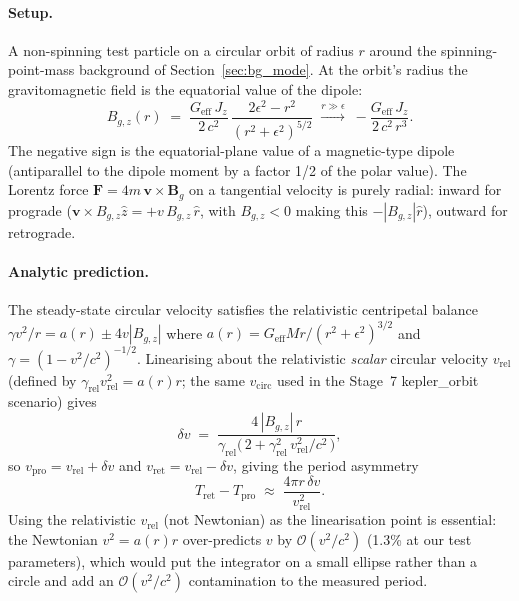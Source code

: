 \documentclass[11pt,a4paper]{article}
\newcommand{\vv}[1]{\mathbf{#1}}
\newcommand{\order}[1]{\mathcal{O}(#1)}
\begin{document}
\paragraph{Setup.}  A non-spinning test particle on a circular orbit of
radius $r$ around the spinning-point-mass background of
Section~\ref{sec:bg_mode}.  At the orbit's radius the gravitomagnetic
field is the equatorial value of the dipole:
\begin{equation}
\label{eq:Bgz_dipole_equatorial}
  B_{g,z}(r) \;=\; \frac{G_{\mathrm{eff}}\,J_z}{2\,c^2}\,
                  \frac{2\epsilon^2 - r^2}{(r^2 + \epsilon^2)^{5/2}}
              \;\xrightarrow{r \gg \epsilon}\;
              -\frac{G_{\mathrm{eff}}\,J_z}{2\,c^2\,r^3}.
\end{equation}
The negative sign is the equatorial-plane value of a magnetic-type
dipole (antiparallel to the dipole moment by a factor 1/2 of the polar
value).  The Lorentz force $\vv{F} = 4m\,\vv{v}\!\times\!\vv{B}_g$ on
a tangential velocity is purely radial: inward for prograde
($\vv{v}\!\times\!B_{g,z}\hat z = +v\,B_{g,z}\,\hat r$, with $B_{g,z}<0$
making this $-|B_{g,z}|\hat r$), outward for retrograde.

\paragraph{Analytic prediction.}  The steady-state circular velocity
satisfies the relativistic centripetal balance
$\gamma v^2/r = a(r) \pm 4 v|B_{g,z}|$
where $a(r) = G_{\mathrm{eff}} M r/(r^2+\epsilon^2)^{3/2}$ and
$\gamma = (1-v^2/c^2)^{-1/2}$.  Linearising about the relativistic
\emph{scalar} circular velocity $v_{\mathrm{rel}}$ (defined by
$\gamma_{\mathrm{rel}} v_{\mathrm{rel}}^2 = a(r) r$; the same
$v_{\mathrm{circ}}$ used in the Stage~7 kepler\_orbit scenario) gives
\begin{equation}
\label{eq:delta_v_lt}
  \delta v \;=\; \frac{4\,|B_{g,z}|\,r}
                      {\gamma_{\mathrm{rel}}\bigl(\,2 + \gamma_{\mathrm{rel}}^2\,v_{\mathrm{rel}}^2/c^2\,\bigr)},
\end{equation}
so $v_{\mathrm{pro}} = v_{\mathrm{rel}} + \delta v$ and
$v_{\mathrm{ret}} = v_{\mathrm{rel}} - \delta v$, giving the period
asymmetry
\begin{equation}
\label{eq:dT_lt}
  T_{\mathrm{ret}} - T_{\mathrm{pro}}
  \;\approx\;  \frac{4\pi r\,\delta v}{v_{\mathrm{rel}}^2}.
\end{equation}
Using the relativistic $v_{\mathrm{rel}}$ (not Newtonian) as the
linearisation point is essential: the Newtonian
$v^2 = a(r) r$ over-predicts $v$ by $\order{v^2/c^2}$ (1.3\% at our
test parameters), which would put the integrator on a small ellipse
rather than a circle and add an $\order{v^2/c^2}$ contamination to the
measured period.
\end{document}
